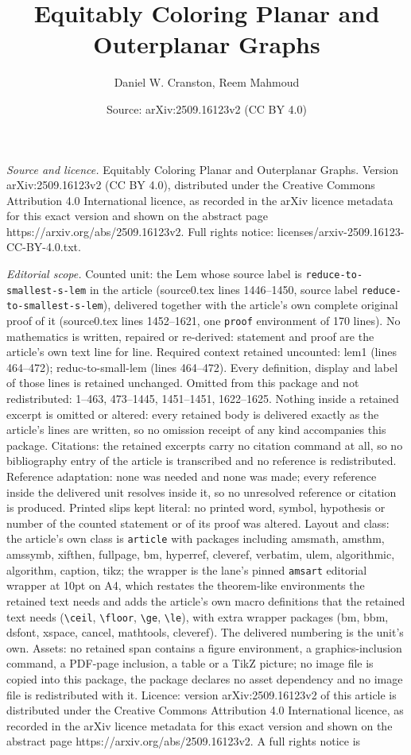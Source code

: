 \documentclass[10pt,a4paper]{amsart}
\title[Equitably Coloring Planar and Outerplanar Graphs]{Equitably Coloring Planar and Outerplanar Graphs}
\author{Daniel W. Cranston, Reem Mahmoud}
\date{Source: arXiv:2509.16123v2 (CC BY 4.0)}
\begin{document}
\maketitle

\noindent\emph{Source and licence.} Equitably Coloring Planar and Outerplanar Graphs. Version arXiv:2509.16123v2 (CC BY 4.0), distributed under the Creative Commons Attribution 4.0 International licence, as recorded in the arXiv licence metadata for this exact version and shown on the abstract page https://arxiv.org/abs/2509.16123v2. Full rights notice: licenses/arxiv-2509.16123-CC-BY-4.0.txt.\par\smallskip

\noindent\textit{Editorial scope.} Counted unit: the Lem whose source label is \texttt{reduce-to-smallest-s-lem} in the article (source0.tex lines 1446--1450, source label \texttt{reduce-to-smallest-s-lem}), delivered together with the article's own complete original proof of it (source0.tex lines 1452--1621, one \texttt{proof} environment of 170 lines). No mathematics is written, repaired or re-derived: statement and proof are the article's own text line for line. Required context retained uncounted: lem1 (lines 464--472); reduc-to-small-lem (lines 464--472). Every definition, display and label of those lines is retained unchanged. Omitted from this package and not redistributed: 1--463, 473--1445, 1451--1451, 1622--1625. Nothing inside a retained excerpt is omitted or altered: every retained body is delivered exactly as the article's lines are written, so no omission receipt of any kind accompanies this package. Citations: the retained excerpts carry no citation command at all, so no bibliography entry of the article is transcribed and no reference is redistributed. Reference adaptation: none was needed and none was made; every reference inside the delivered unit resolves inside it, so no unresolved reference or citation is produced. Printed slips kept literal: no printed word, symbol, hypothesis or number of the counted statement or of its proof was altered. Layout and class: the article's own class is \texttt{article} with packages including amsmath, amsthm, amssymb, xifthen, fullpage, bm, hyperref, cleveref, verbatim, ulem, algorithmic, algorithm, caption, tikz; the wrapper is the lane's pinned \texttt{amsart} editorial wrapper at 10pt on A4, which restates the theorem-like environments the retained text needs and adds the article's own macro definitions that the retained text needs (\texttt{\textbackslash ceil}, \texttt{\textbackslash floor}, \texttt{\textbackslash ge}, \texttt{\textbackslash le}), with extra wrapper packages (bm, bbm, dsfont, xspace, cancel, mathtools, cleveref). The delivered numbering is the unit's own. Assets: no retained span contains a figure environment, a graphics-inclusion command, a PDF-page inclusion, a table or a TikZ picture; no image file is copied into this package, the package declares no asset dependency and no image file is redistributed with it. Licence: version arXiv:2509.16123v2 of this article is distributed under the Creative Commons Attribution 4.0 International licence, as recorded in the arXiv licence metadata for this exact version and shown on the abstract page https://arxiv.org/abs/2509.16123v2. A full rights notice is 
\end{document}
